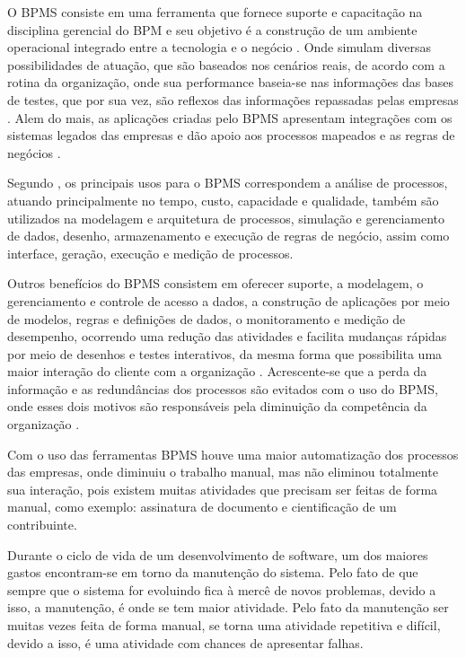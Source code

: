 O BPMS consiste em uma ferramenta que fornece suporte e capacitação na disciplina gerencial do BPM e seu objetivo é a construção de um ambiente operacional integrado entre a tecnologia e o negócio \cite{CBOK}. Onde simulam diversas possibilidades de atuação, que são baseados nos cenários reais, de acordo com a rotina da organização, onde sua performance baseia-se nas informações das bases de testes, que por sua vez, são reflexos das informações repassadas pelas empresas \cite{CBOK}. Alem do mais, as aplicações criadas pelo BPMS apresentam integrações com os sistemas legados das empresas e dão apoio aos processos mapeados e as regras de negócios \cite{CBOK}.

Segundo \cite{CBOK}, os principais usos para o BPMS correspondem a análise de processos, atuando principalmente no tempo, custo, capacidade e qualidade, também são utilizados na modelagem e arquitetura de processos, simulação e gerenciamento de dados, desenho, armazenamento e execução de regras de negócio, assim como interface, geração, execução e medição de processos.

Outros benefícios do BPMS consistem em oferecer suporte, a modelagem, o gerenciamento e controle de acesso a dados, a construção de aplicações por meio de modelos, regras e definições de dados, o monitoramento e medição de desempenho, ocorrendo uma redução das atividades e facilita mudanças rápidas por meio de desenhos e testes interativos, da mesma forma que possibilita uma maior interação do cliente com a organização \cite{CBOK}. Acrescente-se que a perda da informação e as redundâncias dos processos são evitados com o uso do BPMS, onde esses dois motivos são responsáveis pela diminuição da competência da organização \cite{TechAssistBPM}.


Com o uso das ferramentas BPMS houve uma maior automatização dos processos das empresas, onde diminuiu o trabalho manual, mas não eliminou totalmente sua interação, pois existem muitas atividades que precisam ser feitas de forma manual, como exemplo: assinatura de documento e cientificação de um contribuinte. 

Durante o ciclo de vida de um desenvolvimento de software, um dos maiores gastos encontram-se em torno da manutenção do sistema. Pelo fato de que sempre que o sistema for evoluindo fica à mercê de novos problemas, devido a isso, a manutenção, é onde se tem maior atividade. Pelo fato da manutenção ser muitas vezes feita de forma manual, se torna uma atividade repetitiva e difícil, devido a isso, é uma atividade com chances de apresentar falhas.  


